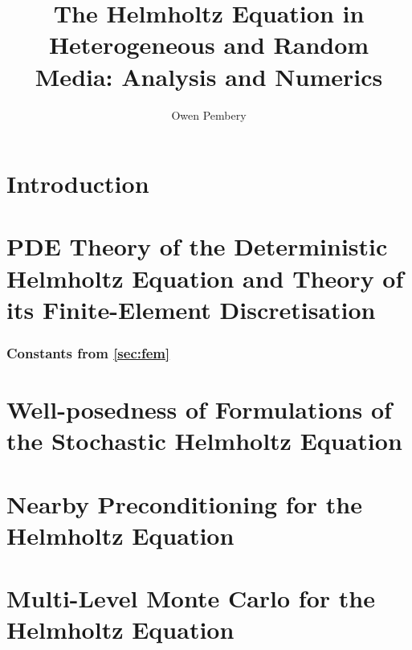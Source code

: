 \documentclass{report}
\title{The Helmholtz Equation in Heterogeneous and Random Media: Analysis and Numerics}
\author{Owen Pembery}
\begin{document}
\maketitle



\tableofcontents



\chapter{Introduction}\label{chap:intro}


\chapter{PDE Theory of the Deterministic Helmholtz Equation and Theory of its Finite-Element Discretisation}\label{chap:background}




\subsection{Constants from \cref{sec:fem}}\label{app:constants}


%

%

\chapter{Well-posedness of Formulations of the Stochastic Helmholtz Equation}\label{chap:stochastic}
 
















\chapter{Nearby Preconditioning for the Helmholtz Equation}\label{chap:nbpc}


\chapter{Multi-Level Monte Carlo for the Helmholtz Equation}\label{chap:mlmc}
\end{document}
